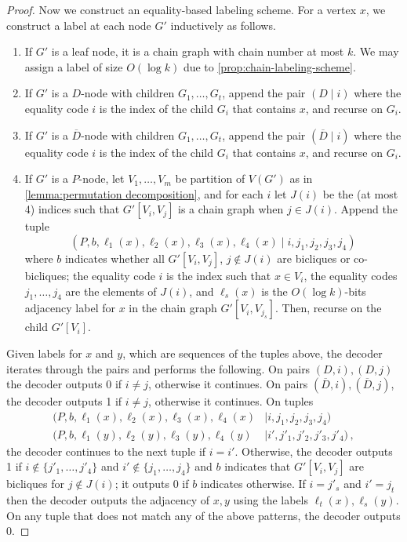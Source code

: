 \documentclass{theoretics}
\newcommand\eqLabelSep{\mathbin|}
\begin{document}
\begin{proof}
Now we construct an equality-based labeling scheme. For a vertex $x$, we construct a label at each
node $G'$ inductively as follows.
\begin{enumerate}
  \item If $G'$ is a leaf node, it is a chain graph with chain number at most $k$. We may assign a
    label of size $O(\log k)$ due to \cref{prop:chain-labeling-scheme}.
  \item If $G'$ is a $D$-node with children $G_1, \dotsc, G_t$, append the pair $(D \eqLabelSep i)$ where
    the equality code $i$ is the index of the child $G_i$ that contains $x$, and recurse on $G_i$.
  \item If $G'$ is a $\overline D$-node with children $G_1, \dotsc, G_t$, append the pair
    $(\overline D \eqLabelSep i)$ where the equality code $i$ is the index of the child $G_i$ that
    contains $x$, and recurse on $G_i$.
  \item If $G'$ is a $P$-node, let $V_1, \dotsc, V_m$ be partition of $V(G')$ as in
    \cref{lemma:permutation decomposition}, and for each $i$ let $J(i)$ be the (at most 4) indices
    such that $G'[V_i,V_j]$ is a chain graph when $j \in J(i)$. Append the tuple
    \[
      (P, b, \ell_1(x),\ell_2(x), \ell_3(x), \ell_4(x) \eqLabelSep i, j_1,  j_2,  j_3, j_4)
    \]
    where $b$ indicates whether all $G'[V_i,V_j]$, $j \notin J(i)$ are bicliques or co-bicliques; the equality code $i$ is the index such that $x \in V_i$, the equality codes $j_1,
    \dotsc, j_4$ are the elements of $J(i)$, and $\ell_s(x)$ is the $O(\log k)$-bits adjacency
    label for $x$ in the chain graph $G'[V_i, V_{j_s}]$. Then, recurse on the child
    $G'[V_i]$.
\end{enumerate}
Given labels for $x$ and $y$, which are sequences of the tuples above, the decoder iterates
through the pairs and performs the following. On pairs $(D, i), (D,j)$ the decoder outputs 0 if $i
\neq j$, otherwise it continues. On pairs $(\overline D, i), (\overline D, j)$, the decoder
outputs 1 if $i \neq j$, otherwise it continues. On tuples
\begin{align*}
      (P, b, \ell_1(x),\ell_2(x), \ell_3(x), \ell_4(x) &\eqLabelSep i, j_1,  j_2,  j_3, j_4) \\
      (P, b, \ell_1(y),\ell_2(y), \ell_3(y), \ell_4(y) &\eqLabelSep i', j'_1,  j'_2,  j'_3, j'_4) \,,
\end{align*}
the decoder continues to the next tuple if $i=i'$. Otherwise,
the decoder outputs 1 if $i \notin \{j'_1, \dotsc, j'_4\}$ and $i' \notin \{j_1, \dotsc, j_4\}$
and $b$ indicates that $G'[V_i,V_j]$ are bicliques for $j \notin J(i)$; it outputs 0 if $b$
indicates otherwise. If $i = j'_s$ and $i' = j_t$ then the decoder outputs the adjacency of $x,y$
using the labels $\ell_t(x), \ell_s(y)$. On any tuple that does not match any of the above
patterns, the decoder outputs 0.


\end{proof}
\end{document}
